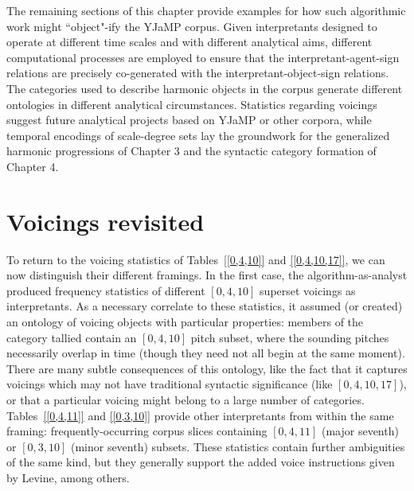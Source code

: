 The remaining sections of this chapter provide examples for how such algorithmic work might ``object"-ify the YJaMP corpus.  Given interpretants designed to operate at different time scales and with different analytical aims, different computational processes are employed to ensure that the interpretant-agent-sign relations are precisely co-generated with the interpretant-object-sign relations.  The categories used to describe harmonic objects in the corpus generate different ontologies in different analytical circumstances.  Statistics regarding voicings suggest future analytical projects based on YJaMP or other corpora, while temporal encodings of scale-degree sets lay the groundwork for the generalized harmonic progressions of Chapter 3 and the syntactic category formation of Chapter 4.
 
\section{Voicings revisited}
To return to the voicing statistics of Tables~\ref{[0,4,10]} and \ref{[0,4,10,17]}, we can now distinguish their different framings.  In the first case, the algorithm-as-analyst produced frequency statistics of different $[0,4,10]$ superset voicings as interpretants.  As a necessary correlate to these statistics, it assumed (or created) an ontology of voicing objects with particular properties: members of the category tallied contain an $[0,4,10]$ pitch subset, where the sounding pitches necessarily overlap in time (though they need not all begin at the same moment).  There are many subtle consequences of this ontology, like the fact that it captures voicings which may not have traditional syntactic significance (like $[0,4,10,17]$), or that a particular voicing might belong to a large number of categories.  Tables~\ref{[0,4,11]} and \ref{[0,3,10]} provide other interpretants from within the same framing: frequently-occurring corpus slices containing $[0,4,11]$ (major seventh) or $[0,3,10]$ (minor seventh) subsets.  These statistics contain further ambiguities of the same kind, but they generally support the added voice instructions given by Levine, among others.

